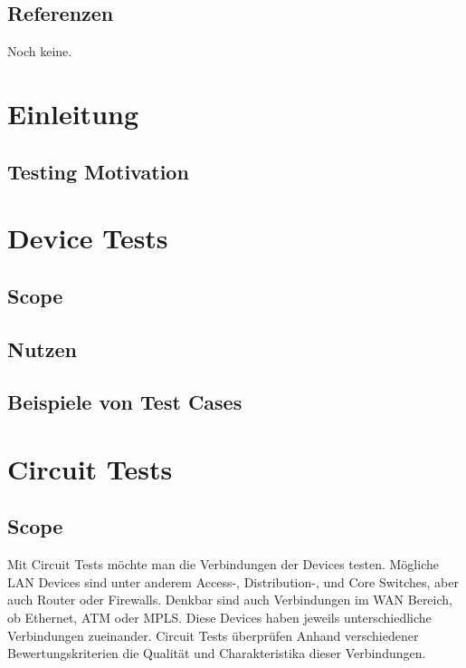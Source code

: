 \documentclass[a4,12pt]{scrartcl}
\begin{document}
\subsection{Referenzen}
\begin{description}
Noch keine.
\end{description}

\section{Einleitung}
\subsection{Testing Motivation}
\subsection{}

\section{Device Tests}
\subsection{Scope}
\subsection{Nutzen}
\subsection{Beispiele von Test Cases}
\newpage
\section{Circuit Tests}
\subsection{Scope}
Mit Circuit Tests möchte man die Verbindungen der Devices testen. Mögliche LAN Devices sind unter anderem Access-, Distribution-, und Core Switches, aber auch Router oder Firewalls. Denkbar sind auch Verbindungen im WAN Bereich, ob Ethernet, ATM oder MPLS. Diese Devices haben jeweils unterschiedliche Verbindungen zueinander. Circuit Tests überprüfen Anhand verschiedener Bewertungskriterien die Qualität und Charakteristika dieser Verbindungen.\\
\end{document}
